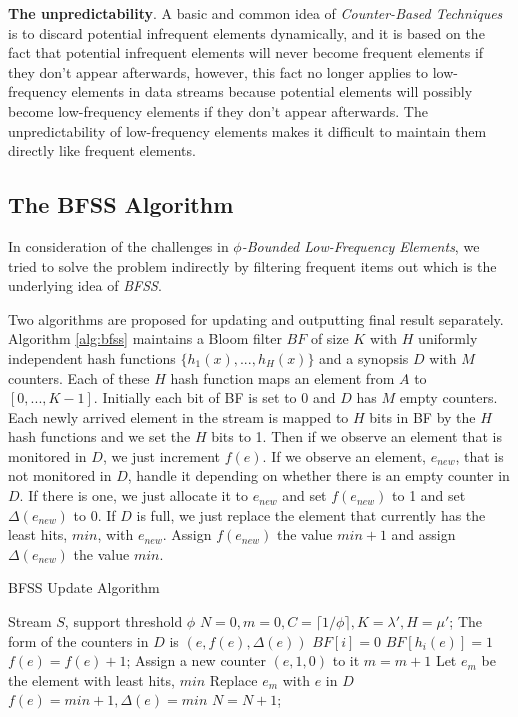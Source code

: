 \documentclass[conference]{IEEEtran}
\begin{document}
\textbf{The unpredictability}. A basic and common idea of \emph{Counter-Based Techniques} is to discard potential infrequent elements dynamically, and it is based on the fact that potential infrequent elements will never become frequent elements if they don't appear afterwards, however, this fact no longer applies to low-frequency elements in data streams because potential elements will possibly become low-frequency elements if they don't appear afterwards. The unpredictability of low-frequency elements makes it difficult to maintain them directly like frequent elements.

\subsection{The BFSS Algorithm}\label{sec:bfss}
In consideration of the challenges in $\phi$\emph{-Bounded Low-Frequency Elements}, we tried to solve the problem indirectly by filtering frequent items out which is the underlying idea of \emph{BFSS}.\par
Two algorithms are proposed for updating and outputting final result separately. Algorithm \ref{alg:bfss} maintains a Bloom filter $BF$ of size $K$ with $H$ uniformly independent hash functions $\{h_1(x),...,h_H(x)\}$ and a synopsis $D$ with $M$ counters. Each of these $H$ hash function maps an element from $A$ to $[0,...,K-1]$. Initially each bit of BF is set to 0 and $D$ has $M$ empty counters. Each newly arrived element in the stream is mapped to $H$ bits in BF by the $H$ hash functions and we set the $H$ bits to 1. Then if we observe an element that is monitored in $D$, we just increment $f(e)$. If we observe an element, $e_{new}$, that is not monitored in $D$, handle it depending on whether there is an empty counter in $D$. If there is one, we just allocate it to $e_{new}$ and set $f(e_{new})$ to 1 and set $\Delta(e_{new})$ to 0. If $D$ is full, we just replace the element that currently has the least hits, $min$, with $e_{new}$. Assign $f(e_{new})$ the value $min+1$ and assign $\Delta(e_{new})$ the value $min$.\par

\begin{algorithm}[h]
	\caption{BFSS Update Algorithm}
	\label{alg:bfss}
\begin{algorithmic}[1]
	\REQUIRE Stream $S$, support threshold $\phi$
	\STATE $N=0,m=0,C=\lceil 1/\phi\rceil,K=\lambda',H=\mu'$; 
	\STATE The form of the counters in $D$ is $(e,f(e),\Delta(e))$
	\STATE $BF[i]=0$
	\ENDFOR
	\STATE $BF[h_i(e)]=1$
	\ENDFOR
	\STATE $f(e)=f(e)+1$;
	\STATE Assign a new counter $(e,1,0)$ to it
	\STATE $m=m+1$
	\ELSE
	\STATE Let $e_m$ be the element with least hits, $min$
	\STATE Replace $e_m$ with $e$ in $D$
	\STATE $f(e)=min+1,\Delta(e)=min$
	\ENDIF
	\STATE $N=N+1$;
	\ENDFOR
\end{algorithmic}
\end{algorithm}
\end{document}
